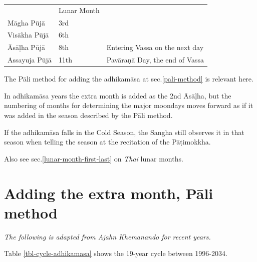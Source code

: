 \documentclass[11pt,oneside]{memoir-article}
\begin{document}
\begin{center}
\begin{tabular}{lll}
 & Lunar Month & \\
Māgha Pūjā & 3rd & \\
Visākha Pūjā & 6th & \\
Āsāḷha Pūjā & 8th & Entering Vassa on the next day\\
Assayuja Pūjā & 11th & Pavāraṇā Day, the end of Vassa\\
\end{tabular}
\end{center}

The Pāli method for adding the adhikamāsa at sec.\ref{pali-method} is
relevant here.

In adhikamāsa years the extra month is added as the 2nd Āsāḷha, but
the numbering of months for determining the major moondays moves
forward as if it was added in the season described by the Pāli method.

If the adhikamāsa falls in the Cold Season, the Sangha still observes
it in that season when telling the season at the recitation of the
Pāṭimokkha.

Also see sec.\ref{lunar-month-first-last} on \emph{Thai} lunar months.
\chapter{Adding the extra month, Pāli method}
\label{sec-2}
\label{pali-method}

\emph{The following is adapted from Ajahn Khemanando for recent
years.}\cite{khemanando-adhikamasa}

Table \ref{tbl-cycle-adhikamasa} shows the 19-year cycle between
1996-2034.
\end{document}
